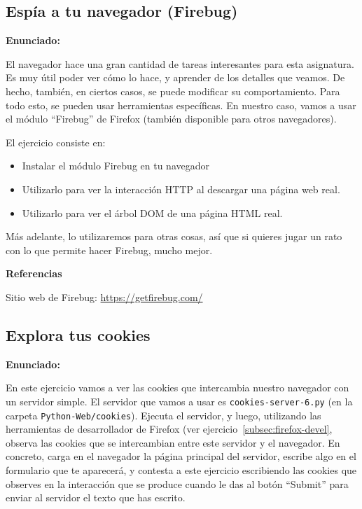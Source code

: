 \subsection{Espía a tu navegador (Firebug)}
\label{subsec:firebug}

\textbf{Enunciado:}

El navegador hace una gran cantidad de tareas interesantes para esta asignatura. Es muy útil poder ver cómo lo hace, y aprender de los detalles que veamos. De hecho, también, en ciertos casos, se puede modificar su comportamiento. Para todo esto, se pueden usar herramientas específicas. En nuestro caso, vamos a usar el módulo ``Firebug'' de Firefox (también disponible para otros navegadores).

El ejercicio consiste en:

\begin{itemize}
\item Instalar el módulo Firebug en tu navegador
\item Utilizarlo para ver la interacción HTTP al descargar una página web real.
\item Utilizarlo para ver el árbol DOM de una página HTML real.
\end{itemize}

Más adelante, lo utilizaremos para otras cosas, así que si quieres jugar un rato con lo que permite hacer Firebug, mucho mejor.

\textbf{Referencias}

Sitio web de Firebug: \url{https://getfirebug.com/}


\subsection{Explora tus cookies}
\label{subsec:explora-cookies}

\textbf{Enunciado:}

En este ejercicio vamos a ver las cookies que intercambia nuestro navegador con un servidor simple. El servidor que vamos a usar es \verb|cookies-server-6.py| (en la carpeta \verb|Python-Web/cookies|). Ejecuta el servidor, y luego, utilizando las herramientas de desarrollador de Firefox (ver ejercicio~\ref{subsec:firefox-devel}, observa las cookies que se intercambian entre este servidor y el navegador. En concreto, carga en el navegador la página principal del servidor, escribe algo en el formulario que te aparecerá, y contesta a este ejercicio escribiendo las cookies que observes en la interacción que se produce cuando le das al botón ``Submit'' para enviar al servidor el texto que has escrito.

